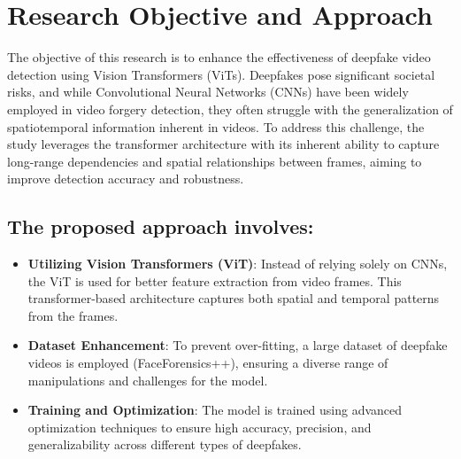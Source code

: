 \section{Research Objective and Approach}
The objective of this research is to enhance the effectiveness of deepfake video detection using Vision Transformers (ViTs). Deepfakes pose significant societal risks, and while Convolutional Neural Networks (CNNs) have been widely employed in video forgery detection, they often struggle with the generalization of spatiotemporal information inherent in videos. To address this challenge, the study leverages the transformer architecture with its inherent ability to capture long-range dependencies and spatial relationships between frames, aiming to improve detection accuracy and robustness.
\subsection{The proposed approach involves:}
\begin{itemize}
    \item \textbf{Utilizing Vision Transformers (ViT)}:
        Instead of relying solely on CNNs, the ViT is used for better feature extraction from video frames. This transformer-based architecture captures both spatial and temporal patterns from the frames.
    \item \textbf{Dataset Enhancement}:
        To prevent over-fitting, a large dataset of deepfake videos is employed (FaceForensics++), ensuring a diverse range of manipulations and challenges for the model.
    \item \textbf{Training and Optimization}:
        The model is trained using advanced optimization techniques to ensure high accuracy, precision, and generalizability across different types of deepfakes.
\end{itemize}
